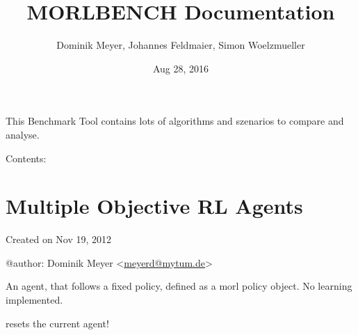 \documentclass[letterpaper,10pt,english]{sphinxmanual}
\title{MORLBENCH Documentation}
\date{Aug 28, 2016}
\author{Dominik Meyer, Johannes Feldmaier, Simon Woelzmueller}
\begin{document}
\maketitle
\tableofcontents
{}\label{index::doc}


This Benchmark Tool contains lots of algorithms and szenarios to compare and analyse.

Contents:


\chapter{Multiple Objective RL Agents}
\label{Agents:welcome-to-morlbench-s-documentation}\label{Agents:multiple-objective-rl-agents}\label{Agents:module-morl_agents}\label{Agents::doc}
Created on Nov 19, 2012

@author: Dominik Meyer \textless{}\href{mailto:meyerd@mytum.de}{meyerd@mytum.de}\textgreater{}

\begin{fulllineitems}
\label{Agents:morl_agents.FixedPolicyAgent}
An agent, that follows a fixed policy, defined as a morl policy object.
No learning implemented.

\begin{fulllineitems}
\label{Agents:morl_agents.FixedPolicyAgent.reset}
resets the current agent!

\end{fulllineitems}


\end{fulllineitems}

\end{document}
